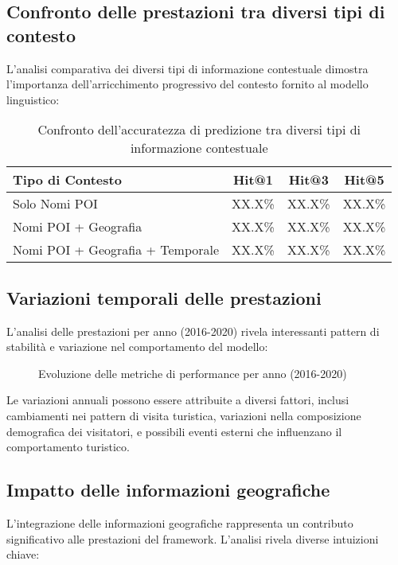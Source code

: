 \subsection{Confronto delle prestazioni tra diversi tipi di contesto}

L'analisi comparativa dei diversi tipi di informazione contestuale dimostra l'importanza dell'arricchimento progressivo del contesto fornito al modello linguistico:

\begin{table}[H]
\centering
\caption{Confronto dell'accuratezza di predizione tra diversi tipi di informazione contestuale}
\label{tab:context_comparison}
\begin{tabular}{@{}lccc@{}}
\toprule
Tipo di Contesto & Hit@1 & Hit@3 & Hit@5 \\
\midrule
Solo Nomi POI & XX.X\% & XX.X\% & XX.X\% \\
Nomi POI + Geografia & XX.X\% & XX.X\% & XX.X\% \\
Nomi POI + Geografia + Temporale & XX.X\% & XX.X\% & XX.X\% \\
\bottomrule
\end{tabular}
\end{table}

\subsection{Variazioni temporali delle prestazioni}

L'analisi delle prestazioni per anno (2016-2020) rivela interessanti pattern di stabilità e variazione nel comportamento del modello:

\begin{figure}[H]
\centering
\caption{Evoluzione delle metriche di performance per anno (2016-2020)}
\label{fig:performance_by_year}
\end{figure}

Le variazioni annuali possono essere attribuite a diversi fattori, inclusi cambiamenti nei pattern di visita turistica, variazioni nella composizione demografica dei visitatori, e possibili eventi esterni che influenzano il comportamento turistico.

\subsection{Impatto delle informazioni geografiche}

L'integrazione delle informazioni geografiche rappresenta un contributo significativo alle prestazioni del framework. L'analisi rivela diverse intuizioni chiave:


